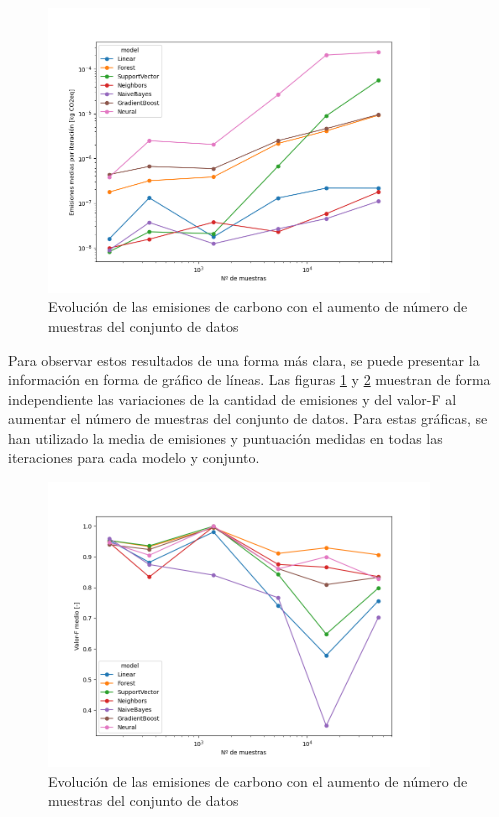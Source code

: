 \begin{figure}[H]
  \centerline{
     \includegraphics[width=0.9\textwidth, keepaspectratio]{img/graph/4-1-line-fitem-nsamples.png}
  }
  \caption{Evolución de las emisiones de carbono con el aumento de número de muestras del conjunto de datos}
  \label{fig:line-emissions-samples}
\end{figure}

Para observar estos resultados de una forma más clara, se puede presentar la información en forma de gráfico de líneas. Las figuras \ref{fig:line-emissions-samples} y \ref{fig:line-fscore-samples} muestran de forma independiente las variaciones de la cantidad de emisiones y del valor-F al aumentar el número de muestras del conjunto de datos. Para estas gráficas, se han utilizado la media de emisiones y puntuación medidas en todas las iteraciones para cada modelo y conjunto.


\begin{figure}[H]
  \centerline{
     \includegraphics[width=0.9\textwidth, keepaspectratio]{img/graph/4-1-line-fscore-nsamples.png}
  }
  \caption{Evolución de las emisiones de carbono con el aumento de número de muestras del conjunto de datos}
  \label{fig:line-fscore-samples}
\end{figure}

